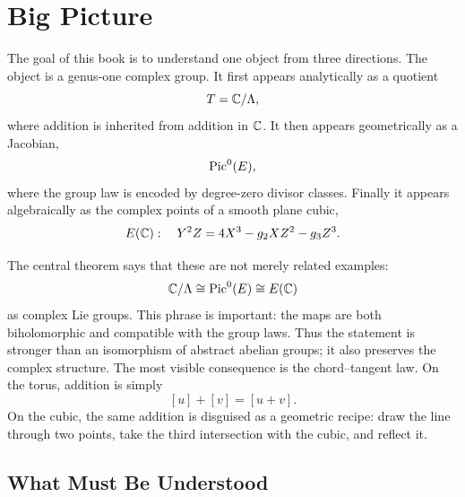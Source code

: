 \chapter*{Big Picture}
\label{front:big-picture}

The goal of this book is to understand one object from three directions.  The
object is a genus-one complex group.  It first appears analytically as a quotient
\[
  T=\mathbb{C}/\Lambda,
\]
where addition is inherited from addition in \(\mathbb{C}\).  It then appears
geometrically as a Jacobian,
\[
  \operatorname{Pic}^0(E),
\]
where the group law is encoded by degree-zero divisor classes.  Finally it
appears algebraically as the complex points of a smooth plane cubic,
\[
  E(\mathbb{C}):\quad Y^2Z=4X^3-g_2XZ^2-g_3Z^3.
\]

\begin{center}
\resizebox{0.82\linewidth}{!}{\classicTrinityDiagram}
\end{center}

\noindent
The central theorem says that these are not merely related examples:
\[
  \mathbb{C}/\Lambda \cong \operatorname{Pic}^0(E) \cong E(\mathbb{C})
\]
as complex Lie groups.  This phrase is important: the maps are both
biholomorphic and compatible with the group laws.  Thus the statement is
stronger than an isomorphism of abstract abelian groups; it also preserves the
complex structure.  The most visible consequence is the chord--tangent law.  On
the torus, addition is simply
\[
  [u]+[v]=[u+v].
\]
On the cubic, the same addition is disguised as a geometric recipe: draw the line
through two points, take the third intersection with the cubic, and reflect it.

\section*{What Must Be Understood}


